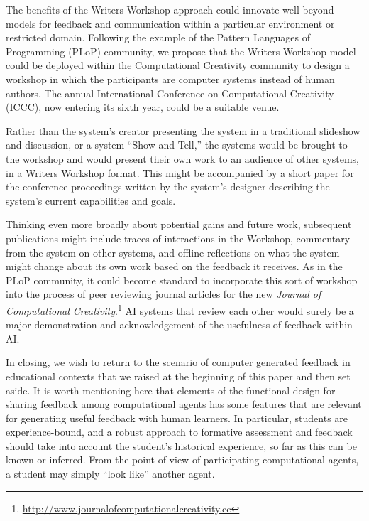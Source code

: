 
The benefits of the Writers Workshop approach could innovate well beyond models for 
feedback and communication within a particular environment or restricted domain. 
Following the example of the Pattern Languages of Programming (PLoP) community, we propose that the Writers Workshop model could be deployed
within the Computational Creativity community to design a workshop in
which the participants are computer systems instead of human authors.
The annual International Conference on Computational Creativity
(ICCC), now entering its sixth year, could be a suitable venue. 

Rather than the system's creator presenting the system in a
traditional slideshow and discussion, or a system ``Show and Tell,''
the systems would be brought to the workshop and would present their
own work to an audience of other systems, in a Writers Workshop
format.  This might be accompanied by a short paper for the conference
proceedings written by the system's designer describing the system's
current capabilities and goals.  

Thinking even more broadly about potential gains and future work, subsequent publications might include
traces of interactions in the Workshop, commentary from the system on
other systems, and offline reflections on what the system might change
about its own work based on the feedback it receives.  As in the PLoP
community, it could become standard to incorporate this sort of workshop
into the process of peer reviewing journal articles for the new \emph{Journal of
  Computational Creativity}.\footnote{\url{http://www.journalofcomputationalcreativity.cc}} AI systems that review each other would surely be a major demonstration and acknowledgement of the usefulness of feedback within AI.

In closing, we wish to return to the scenario of computer generated
feedback in educational contexts that we raised at the beginning of
this paper and then set aside.  It is worth mentioning here that
elements of the functional design for sharing feedback among
computational agents has some features that are relevant for
generating useful feedback with human learners.  In particular,
students are experience-bound, and a robust approach to formative
assessment and feedback should take into account the student's historical experience, so far as
this can be known or inferred.  From the point of view of
participating computational agents, a student may simply ``look like'' another
agent.  
